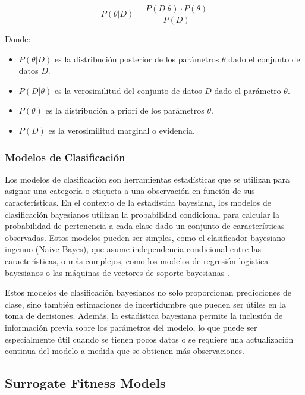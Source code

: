 \begin{equation}
P(\theta|D) = \frac{P(D|\theta) \cdot P(\theta)}{P(D)}
\end{equation}

Donde:
\begin{itemize}
    \item $P(\theta|D)$ es la distribución posterior de los parámetros $\theta$ dado el conjunto de datos $D$.
    \item $P(D|\theta)$ es la verosimilitud del conjunto de datos $D$ dado el parámetro $\theta$.
    \item $P(\theta)$ es la distribución a priori de los parámetros $\theta$.
    \item $P(D)$ es la verosimilitud marginal o evidencia.
\end{itemize}


\subsubsection{Modelos de Clasificación}

Los modelos de clasificación son herramientas estadísticas que se utilizan para asignar una categoría o etiqueta a una observación en función de sus características. En el contexto de la estadística bayesiana, los modelos de clasificación bayesianos utilizan la probabilidad condicional para calcular la probabilidad de pertenencia a cada clase dado un conjunto de características observadas. Estos modelos pueden ser simples, como el clasificador bayesiano ingenuo (Naive Bayes), que asume independencia condicional entre las características, o más complejos, como los modelos de regresión logística bayesianos o las máquinas de vectores de soporte bayesianas \cite{Murphy2012_nx}.

Estos modelos de clasificación bayesianos no solo proporcionan predicciones de clase, sino también estimaciones de incertidumbre que pueden ser útiles en la toma de decisiones. Además, la estadística bayesiana permite la inclusión de información previa sobre los parámetros del modelo, lo que puede ser especialmente útil cuando se tienen pocos datos o se requiere una actualización continua del modelo a medida que se obtienen más observaciones.

\vspace{2mm}




\subsection{Surrogate Fitness Models}


